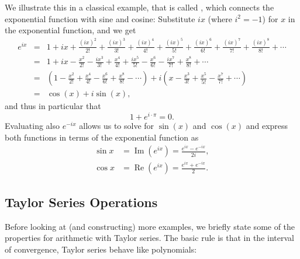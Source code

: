 We illustrate this in a classical example, that is called , which connects the exponential function with sine and cosine: Substitute $ix$ (where $i^2=-1$)
for $x$ in the exponential function, and we get
\begin{eqnarray*}
 e^{ix} &=& 1 + ix + \frac{(ix)^2}{2!} + \frac{(ix)^3}{3!} + \frac{(ix)^4}{4!} + \frac{(ix)^5}{5!} + \frac{(ix)^6}{6!} + \frac{(ix)^7}{7!} + \frac{(ix)^8}{8!} + \cdots \\
 &=& 1 + ix - \frac{x^2}{2!} - \frac{ix^3}{3!} + \frac{x^4}{4!} + \frac{ix^5}{5!} - \frac{x^6}{6!} - \frac{ix^7}{7!} + \frac{x^8}{8!} + \cdots \\
 &=& \left( 1 - \frac{x^2}{2!} + \frac{x^4}{4!} - \frac{x^6}{6!} + \frac{x^8}{8!} - \cdots \right) + i\left( x - \frac{x^3}{3!} + \frac{x^5}{5!} - \frac{x^7}{7!} + \cdots \right) \\
 &=& \cos(x) + i\sin(x) ,
\end{eqnarray*}
and thus in particular that
\[
1+e^{i\cdot\pi}=0.
\]
Evaluating also $e^{-ix}$ allows us to solve for $\sin(x)$ and $\cos(x)$ and
express both functions in terms of the exponential function as
\begin{eqnarray*}
\sin x &= \operatorname{Im} \left(e^{ix}\right) =\frac{e^{ix} - e^{-ix}}{2i},\\
\cos x &= \operatorname{Re} \left(e^{ix}\right) =\frac{e^{ix} + e^{-ix}}{2}.
\end{eqnarray*}

\subsection{Taylor Series Operations}

Before looking at (and constructing) more examples, we briefly state some
of the properties for arithmetic with Taylor series. The basic rule is that
in the interval of convergence, Taylor series behave like polynomials:


